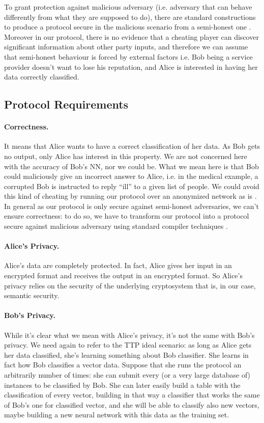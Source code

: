 \documentclass[11pt,oribibl,runningheads]{llncs}
\begin{document}
To grant protection against malicious adversary (i.e. adversary
that can behave differently from what they are supposed to do),
there are standard constructions to produce a protocol secure in
the malicious scenario from a semi-honest one
\cite{Gold87}. Moreover in our protocol, there is no
evidence that a cheating player can discover significant
information about other party inputs, and therefore we can assume that semi-honest behaviour is forced 
by external factors i.e. Bob being a service provider
doesn't want to lose his reputation, and Alice is interested in having her data correctly classified.


\subsection{Protocol Requirements}

\paragraph{Correctness.}
 It means that Alice wants to have a
    correct classification of her data. As Bob gets no output, only Alice has
    interest in this property. We are not concerned here
    with the accuracy of Bob's NN, nor we could be.
    What we mean here is that Bob could maliciously give an incorrect answer to Alice, i.e.
in the medical example, a corrupted Bob is instructed to reply ``ill'' to a given list of
    people. We could avoid this kind of cheating by running our protocol over an anonymized network as is \cite{tor-design}.
 In general as our protocol is only secure against semi-honest
    adversaries, we can't ensure correctness: to do so,
    we have to transform our protocol into a protocol secure
    against malicious adversary using standard compiler techniques \cite{Gold87}.


\paragraph{Alice's Privacy.}
Alice's data are completely protected. In fact, Alice gives her input in an
    encrypted format and receives the output in an encrypted
    format. So Alice's privacy relies on the security of the
    underlying cryptosystem that is, in our case, semantic security.

\paragraph{Bob's Privacy.}
While it's clear what we mean with Alice's privacy, it's not the
same with Bob's privacy. We need again to refer to the TTP ideal
scenario: as long as Alice gets her data classified, she's learning
something about Bob classifier. She learns in fact how Bob
classifies a vector data. Suppose that she runs the protocol an
arbitrarily number of times: she can submit every (or
a very large database of) instances to be classified by Bob. She
can later easily build a table with the classification of every
vector, building in that way a classifier that works the same of
Bob's one for classified vector, and she will be able to
classify also new vectors, maybe building a new neural network
with this data as the training set.
\end{document}
